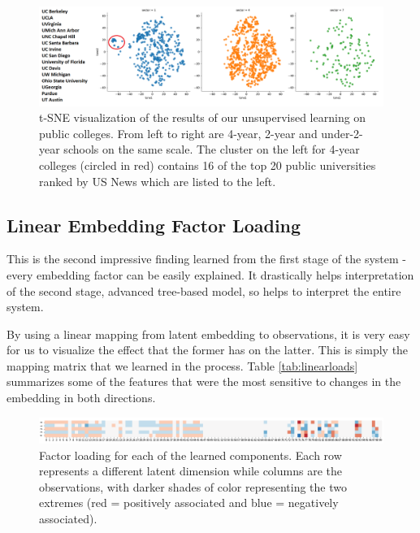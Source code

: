 \documentclass[11pt,letter]{article}
\begin{document}
\begin{figure}[H]
\centering
\includegraphics[width=0.75\linewidth]{public_cluster.png}
\caption{t-SNE visualization of the results of our unsupervised learning on public colleges. From left to right are 4-year, 2-year and under-2-year schools on the same scale. The cluster on the left for 4-year colleges (circled in red) contains 16 of the top 20 public universities ranked by US News which are listed to the left. }
\end{figure}

\subsection{Linear Embedding Factor Loading}

This is the second impressive finding learned from the first stage of the system - every embedding factor can be easily explained. It drastically helps interpretation of the second stage, advanced tree-based model, so helps to interpret the entire system. 

By using a linear mapping from latent embedding to observations, it is very easy for us to visualize the effect that the former has on the latter. This is simply the mapping matrix that we learned in the process. Table \ref{tab:linearloads} summarizes some of the features that were the most sensitive to changes in the embedding in both directions. 
\begin{figure}[H]
\centering
\includegraphics[scale=0.45]{loading.png}
\caption{Factor loading for each of the learned components. Each row represents a different latent dimension while columns are the observations, with darker shades of color representing the two extremes (red = positively associated and blue = negatively associated).  }
\end{figure}
\end{document}
